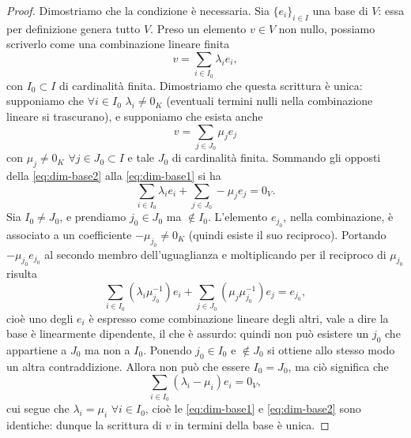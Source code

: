 \begin{proof}
	Dimostriamo che la condizione è necessaria.
	Sia $\{e_i\}_{i\in I}$ una base di $V$: essa per definizione genera tutto $V$.
	Preso un elemento $v\in V$ non nullo, possiamo scriverlo come una combinazione lineare finita
	\begin{equation} \label{eq:dim-base1}
		  v=\sum_{i\in I_0}\lambda_ie_i,
	\end{equation}
	con $I_0\subset I$ di cardinalità finita.
	Dimostriamo che questa scrittura è unica: supponiamo che $\forall i\in I_0$ $\lambda_i\neq 0_K$ (eventuali termini nulli nella combinazione lineare si trascurano), e supponiamo che esista anche
	\begin{equation} \label{eq:dim-base2}
		  v=\sum_{j\in J_0}\mu_je_j
	\end{equation}
	con $\mu_j\neq 0_K$ $\forall j\in J_0\subset I$ e tale $J_0$ di cardinalità finita.
	Sommando gli opposti della \eqref{eq:dim-base2} alla \eqref{eq:dim-base1} si ha
	\begin{equation*}
		\sum_{i\in I_0}\lambda_ie_i+\sum_{j\in J_0}-\mu_je_j=0_V.
	\end{equation*}
	Sia $I_0\ne J_0$, e prendiamo $j_0\in J_0$ ma $\notin I_0$.
	L'elemento $e_{j_0}$, nella combinazione, è associato a un coefficiente $-\mu_{j_0}\neq 0_K$ (quindi esiste il suo reciproco).
	Portando $-\mu_{j_0}  e_{j_0}$ al secondo membro dell'uguaglianza e moltiplicando per il reciproco di $\mu_{j_0}$ risulta
	\begin{equation*}
		\sum_{i\in I_0}(\lambda_i\mu_{j_0}^{-1})e_i+\sum_{j\in J_0}(\mu_j\mu_{j_0}^{-1})e_j=e_{j_0},
	\end{equation*}
	cioè uno degli $e_i$ è espresso come combinazione lineare degli altri, vale a dire la base è linearmente dipendente, il che è assurdo: quindi non può esistere un $j_0$ che appartiene a $J_0$ ma non a $I_0$.
	Ponendo $j_0\in I_0$ e $\notin J_0$ si ottiene allo stesso modo un altra contraddizione.
	Allora non può che essere $I_0=J_0$, ma ciò significa che
	\begin{equation*}
		\sum_{i\in I_0}(\lambda_i-\mu_i)e_i=0_V,
	\end{equation*}
	cui segue che $\lambda_i=\mu_i$ $\forall i\in I_0$, cioè le \eqref{eq:dim-base1} e \eqref{eq:dim-base2} sono identiche: dunque la scrittura di $v$ in termini della base è unica.


\end{proof}
